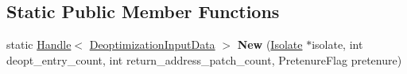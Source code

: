 \subsection*{Static Public Member Functions}
\begin{DoxyCompactItemize}
\item 
\hypertarget{classv8_1_1internal_1_1_deoptimization_input_data_a6608ef864bd3af52af0ffd189893303a}{}static \hyperlink{classv8_1_1internal_1_1_handle}{Handle}$<$ \hyperlink{classv8_1_1internal_1_1_deoptimization_input_data}{Deoptimization\+Input\+Data} $>$ {\bfseries New} (\hyperlink{classv8_1_1internal_1_1_isolate}{Isolate} $\ast$isolate, int deopt\+\_\+entry\+\_\+count, int return\+\_\+address\+\_\+patch\+\_\+count, Pretenure\+Flag pretenure)\label{classv8_1_1internal_1_1_deoptimization_input_data_a6608ef864bd3af52af0ffd189893303a}

\end{DoxyCompactItemize}
